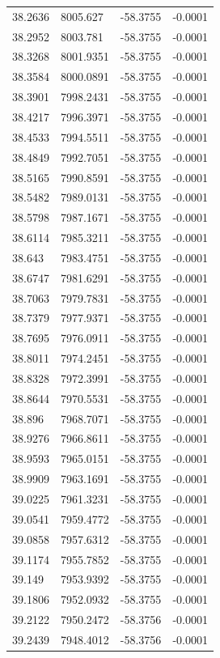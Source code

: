 \begin{table}[H]
\begin{tabular}{llll}
38.2636 & 8005.627 & -58.3755 & -0.0001 \\
38.2952 & 8003.781 & -58.3755 & -0.0001 \\
38.3268 & 8001.9351 & -58.3755 & -0.0001 \\
38.3584 & 8000.0891 & -58.3755 & -0.0001 \\
38.3901 & 7998.2431 & -58.3755 & -0.0001 \\
38.4217 & 7996.3971 & -58.3755 & -0.0001 \\
38.4533 & 7994.5511 & -58.3755 & -0.0001 \\
38.4849 & 7992.7051 & -58.3755 & -0.0001 \\
38.5165 & 7990.8591 & -58.3755 & -0.0001 \\
38.5482 & 7989.0131 & -58.3755 & -0.0001 \\
38.5798 & 7987.1671 & -58.3755 & -0.0001 \\
38.6114 & 7985.3211 & -58.3755 & -0.0001 \\
38.643 & 7983.4751 & -58.3755 & -0.0001 \\
38.6747 & 7981.6291 & -58.3755 & -0.0001 \\
38.7063 & 7979.7831 & -58.3755 & -0.0001 \\
38.7379 & 7977.9371 & -58.3755 & -0.0001 \\
38.7695 & 7976.0911 & -58.3755 & -0.0001 \\
38.8011 & 7974.2451 & -58.3755 & -0.0001 \\
38.8328 & 7972.3991 & -58.3755 & -0.0001 \\
38.8644 & 7970.5531 & -58.3755 & -0.0001 \\
38.896 & 7968.7071 & -58.3755 & -0.0001 \\
38.9276 & 7966.8611 & -58.3755 & -0.0001 \\
38.9593 & 7965.0151 & -58.3755 & -0.0001 \\
38.9909 & 7963.1691 & -58.3755 & -0.0001 \\
39.0225 & 7961.3231 & -58.3755 & -0.0001 \\
39.0541 & 7959.4772 & -58.3755 & -0.0001 \\
39.0858 & 7957.6312 & -58.3755 & -0.0001 \\
39.1174 & 7955.7852 & -58.3755 & -0.0001 \\
39.149 & 7953.9392 & -58.3755 & -0.0001 \\
39.1806 & 7952.0932 & -58.3755 & -0.0001 \\
39.2122 & 7950.2472 & -58.3756 & -0.0001 \\
39.2439 & 7948.4012 & -58.3756 & -0.0001 \\

\end{tabular}
\end{table}
